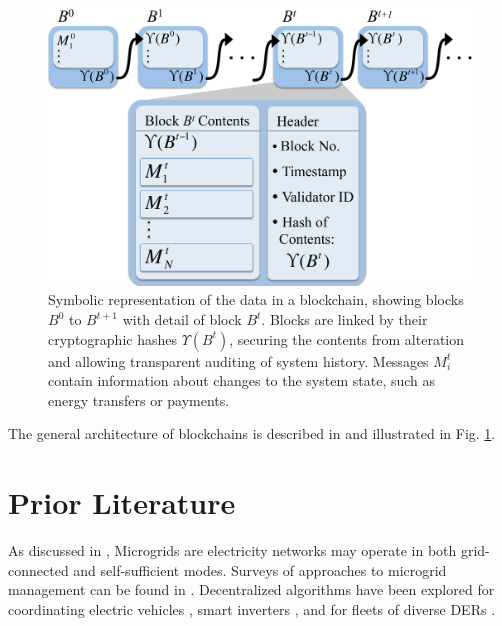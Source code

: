 \lipsum[4]
\begin{figure} 
\centering
\includegraphics[scale = 0.35]{Blockchain_Graphic.pdf}
\caption{Symbolic representation of the data in a blockchain, showing blocks $B^0$ to $B^{t+1}$ with detail of block $B^t$. Blocks are linked by their cryptographic hashes $\Upsilon(B^t)$, securing the contents from alteration and allowing transparent auditing of system history. Messages $M_i^t$ contain information about changes to the system state, such as energy transfers or payments.}
\label{fig:blockfig}
\end{figure}

The general architecture of blockchains is described in \cite{Wood2014} and illustrated in Fig. \ref{fig:blockfig}. 
\lipsum[21]

\section{Prior Literature}
\label{sec:litreview}

As discussed in \cite{Ton2012}, 
Microgrids are electricity networks may operate in both grid-connected and self-sufficient modes. Surveys of approaches to microgrid management can be found in \cite{AhmadKhan2016,Minchala-Avila2015}. Decentralized algorithms have been explored for coordinating electric vehicles \cite{LeFloch2016,LeFloch2016a}, smart inverters \cite{Sondermeijer2016}, and for fleets of diverse DERs \cite{Mhanna2016,Tsai2015,Wang2016}. 
\lipsum[25]




